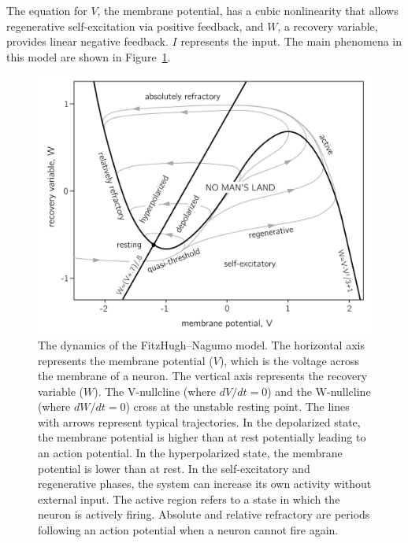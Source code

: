 \documentclass[
  a4paper,
  DIV=11,
  numbers=noendperiod,
  oneside]{scrreprt}
\begin{document}
The equation for \(V\), the membrane potential, has a cubic nonlinearity
that allows regenerative self-excitation via positive feedback, and
\(W\), a recovery variable, provides linear negative feedback. \(I\)
represents the input. The main phenomena in this model are shown in
Figure~\ref{fig-ch4n-img15-old-63}.

\begin{figure}

{\centering \includegraphics{media/ch4n/ch4n-15__figure64.png}

}

\caption{\label{fig-ch4n-img15-old-63}The dynamics of the
FitzHugh--Nagumo model. The horizontal axis represents the membrane
potential (\(V\)), which is the voltage across the membrane of a neuron.
The vertical axis represents the recovery variable (\(W\)). The
V-nullcline (where \(dV/dt = 0\)) and the W-nullcline (where
\(dW/dt = 0\)) cross at the unstable resting point. The lines with
arrows represent typical trajectories. In the depolarized state, the
membrane potential is higher than at rest potentially leading to an
action potential. In the hyperpolarized state, the membrane potential is
lower than at rest. In the self-excitatory and regenerative phases, the
system can increase its own activity without external input. The active
region refers to a state in which the neuron is actively firing.
Absolute and relative refractory are periods following an action
potential when a neuron cannot fire again.}

\end{figure}
\end{document}
